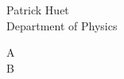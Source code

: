 \documentclass{article}
\def\\ml{m_L}
\begin{document}
\begin{center}
	Patrick Huet\\
	Department of Physics \\
\end{center}
\begin{flushleft}
A\\ B
\end{flushleft}
\end{document}
